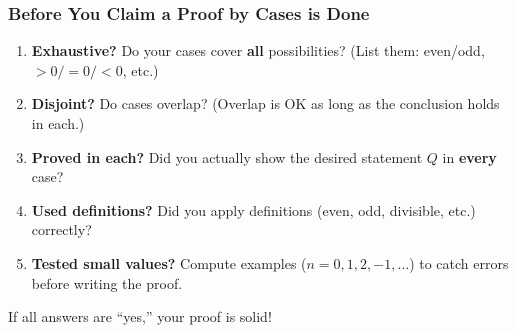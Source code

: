 \documentclass{beamer}
\begin{document}
\begin{frame}
  \frametitle{Before You Claim a Proof by Cases is Done}

  \begin{enumerate}
    \item {\color{maroon}\textbf{Exhaustive?}} Do your cases cover \textbf{all} possibilities? (List them: even/odd, $> 0 / = 0 / < 0$, etc.)
    
    \item {\color{maroon}\textbf{Disjoint?}} Do cases overlap? (Overlap is OK as long as the conclusion holds in each.)
    
    \item {\color{maroon}\textbf{Proved in each?}} Did you actually show the desired statement $Q$ in \textbf{every} case?
    
    \item {\color{maroon}\textbf{Used definitions?}} Did you apply definitions (even, odd, divisible, etc.) correctly?
    
    \item {\color{maroon}\textbf{Tested small values?}} Compute examples ($n = 0, 1, 2, -1, \ldots$) to catch errors before writing the proof.
  \end{enumerate}

  \vspace{0.3cm}
  If all answers are ``yes,'' your proof is solid!
\end{frame}
\end{document}

